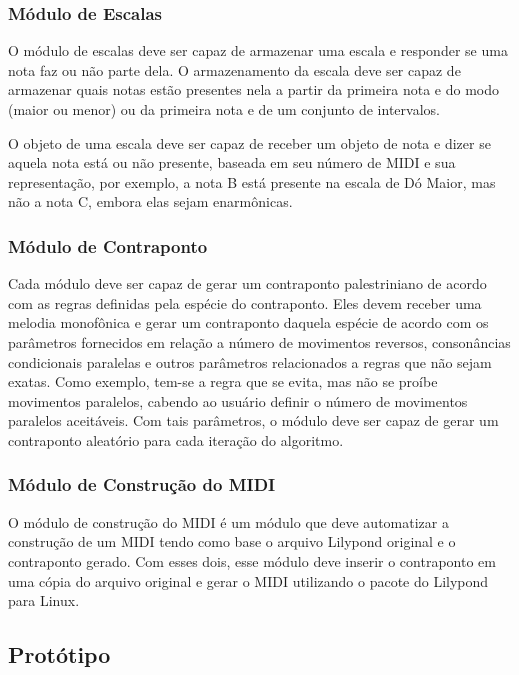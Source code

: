     \subsubsection[Módulo de Escalas]{Módulo de Escalas}

      O módulo de escalas deve ser capaz de armazenar uma escala e responder se uma nota faz ou não parte dela. O armazenamento da escala deve ser capaz de armazenar quais notas estão presentes nela a partir da primeira nota e do modo (maior ou menor) ou da primeira nota e de um conjunto de intervalos.

      O objeto de uma escala deve ser capaz de receber um objeto de nota e dizer se aquela nota está ou não presente, baseada em seu número de MIDI e sua representação, por exemplo, a nota B está presente na escala de Dó Maior, mas não a nota C\fl{}, embora elas sejam enarmônicas.

    \subsubsection[Módulos de Contraponto]{Módulo de Contraponto}

      Cada módulo deve ser capaz de gerar um contraponto palestriniano de acordo com as regras definidas pela espécie do contraponto. Eles devem receber uma melodia monofônica e gerar um contraponto daquela espécie de acordo com os parâmetros fornecidos em relação a número de movimentos reversos, consonâncias condicionais paralelas e outros parâmetros relacionados a regras que não sejam exatas. Como exemplo, tem-se a regra que se evita, mas não se proíbe movimentos paralelos, cabendo ao usuário definir o número de movimentos paralelos aceitáveis. Com tais parâmetros, o módulo deve ser capaz de gerar um contraponto aleatório para cada iteração do algoritmo.

    \subsubsection[Módulo de Construção do MIDI]{Módulo de Construção do MIDI}

      O módulo de construção do MIDI é um módulo que deve automatizar a construção de um MIDI tendo como base o arquivo Lilypond original e o contraponto gerado. Com esses dois, esse módulo deve inserir o contraponto em uma cópia do arquivo original e gerar o MIDI utilizando o pacote do Lilypond para Linux.

  \subsection[Protótipo]{Protótipo}

